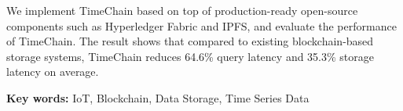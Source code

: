 We implement TimeChain based on top of production-ready open-source components such as Hyperledger Fabric and IPFS, and evaluate the performance of TimeChain. 
The result shows that compared to existing blockchain-based storage systems, TimeChain reduces 64.6\% query latency and 35.3\% storage latency on average.


{\noindent \textbf{Key words:} IoT, Blockchain, Data Storage, Time Series Data}
